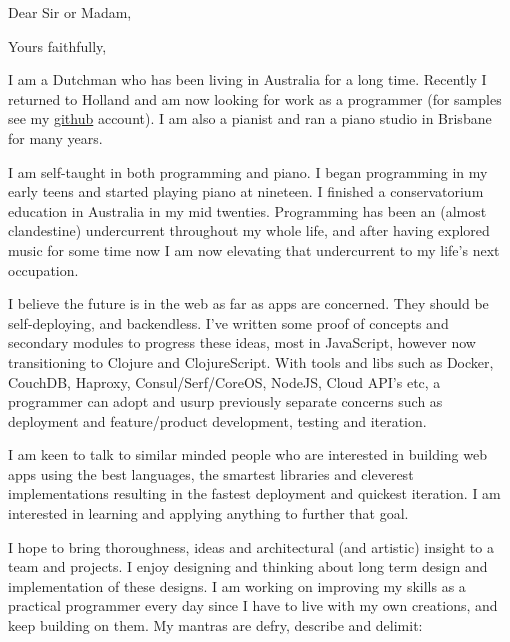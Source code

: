 \documentclass[11pt,a4paper,sans]{moderncv}        %
\begin{document}
\setcounter{page}{1}
 


\date{\today}
\opening{Dear Sir or Madam,}
\closing{Yours faithfully,}
\makelettertitle
\justify
I am a Dutchman who has been living in Australia for a long time. Recently I
returned to Holland and am now looking for work as a programmer (for samples see
my \href{http://github.com/michieljoris}{github} account). I am also a pianist and ran a piano studio in Brisbane for
many years.

I am self-taught in both programming and piano. I began programming in my early teens and started playing piano at nineteen. I finished a conservatorium education in Australia in my mid twenties. Programming has been an (almost clandestine) undercurrent throughout my whole life, and after having explored music for some time now I am now elevating that undercurrent to my life's next occupation.

I believe the future is in the web as far as apps are concerned. They should be
self-deploying, and backendless. I've written some proof of concepts and
secondary modules to progress these ideas, most in JavaScript, however now
transitioning to Clojure and ClojureScript. With tools and libs such as Docker,
CouchDB, Haproxy, Consul/Serf/CoreOS, NodeJS, Cloud API's etc, a programmer can
adopt and usurp previously separate concerns such as deployment and
feature/product development, testing and iteration.

I am keen to talk to similar minded people who are interested in building web apps using the best languages, the smartest libraries and cleverest implementations resulting in the fastest deployment and quickest iteration. I am interested in learning and applying anything to further that goal. 

I hope to bring thoroughness, ideas and architectural (and artistic) insight to a team and projects. I enjoy designing and thinking about long term design and implementation of these designs. I am working on improving my skills as a practical programmer every day since I have to live with my own creations, and keep building on them. My mantras are defry, describe and delimit:
\vspace{3mm} %
\renewcommand{\labelitemi}{\textbullet}
\end{document}
